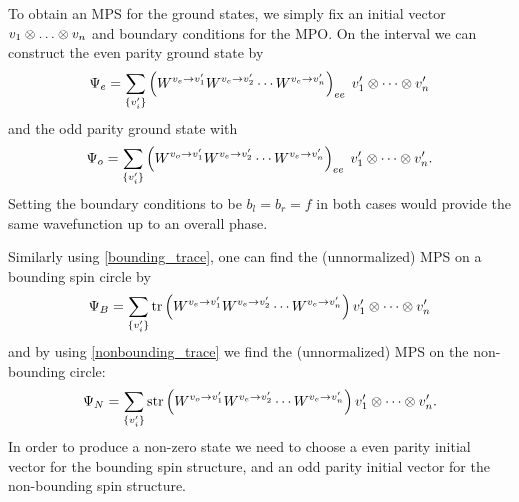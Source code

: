 To obtain an MPS for the ground states, we simply fix an initial vector $v_1\tp \dots \tp v_n$ and boundary conditions for the MPO. 
On the interval we can construct the even parity ground state by
\begin{align}
\Psi_{e} = \sum_{\{v_i' \}} \left( W^{v_e \rightarrow v_1'} W^{v_e \rightarrow v_2'} \cdots W^{v_e \rightarrow v_n'} \right)_{ee} \; v_1' \otimes \cdots \otimes v_n' 
\end{align} 
and the odd parity ground state with
\begin{align}
\Psi_{o} = \sum_{\{v_i' \}} \left( W^{v_o \rightarrow v_1'} W^{v_e \rightarrow v_2'} \cdots W^{v_e \rightarrow v_n'} \right)_{ee} \; v_1' \otimes \cdots \otimes v_n'.
\end{align} 
Setting the boundary conditions to be $b_l=b_r=f$ in both cases would provide the same wavefunction up to an overall phase.

Similarly using \eqref{bounding_trace}, one can find the (unnormalized) MPS on a bounding spin circle by
\begin{align} 
\Psi_B = \sum_{\{ v_i ' \} } \text{tr} \left( W^{v_e \rightarrow v_1'} W^{v_e \rightarrow v_2'} \cdots W^{v_e \rightarrow v_n'} \right) v_1' \otimes \cdots \otimes v_n' 
\end{align}
and by using \eqref{nonbounding_trace} we find the (unnormalized) MPS on the non-bounding circle:
\begin{align} 
\Psi_N = \sum_{\{ v_i ' \} } \text{str} \left( W^{v_o \rightarrow v_1'} W^{v_e \rightarrow v_2'} \cdots W^{v_e \rightarrow v_n'} \right) v_1' \otimes \cdots \otimes v_n'.
\end{align}
In order to produce a non-zero state we need to choose a even parity initial vector for the bounding spin structure, 
and an odd parity initial vector for the non-bounding spin structure. 

